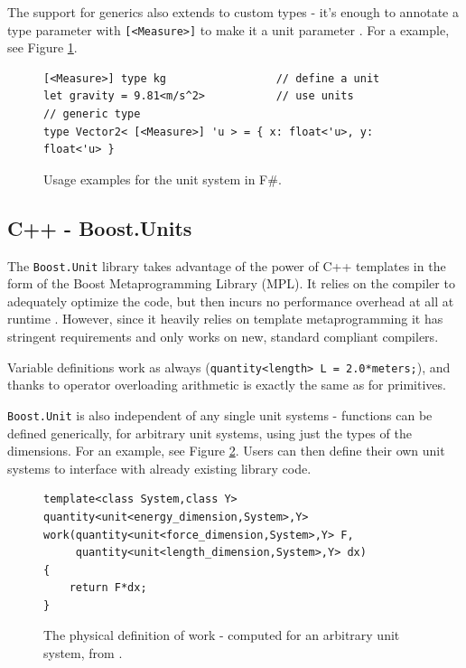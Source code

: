 \documentclass[12pt,oneside,a4paper]{scrbook}
\begin{document}
The support for generics also extends to custom types - it's enough to annotate a type parameter with \verb/[<Measure>]/ to make it a unit parameter \citep{Kennedy08:4}. For a example, see Figure \ref{code:fsharp}.


\begin{figure}
\begin{verbatim}
[<Measure>] type kg                 // define a unit
let gravity = 9.81<m/s^2>           // use units
// generic type
type Vector2< [<Measure>] 'u > = { x: float<'u>, y: float<'u> }
\end{verbatim}
\caption{Usage examples for the unit system in F\#.}
\label{code:fsharp}
\end{figure}

\subsection{C++ - Boost.Units}

The \verb/Boost.Unit/ library takes advantage of the power of C++ templates in the form of the Boost Metaprogramming Library (MPL).  It relies on the compiler to adequately optimize the code, but then incurs no performance overhead at all at runtime \citep{Schabel10}. However, since it heavily relies on template metaprogramming it has stringent requirements and only works on new, standard compliant compilers.

Variable definitions work as always (\verb/quantity<length> L = 2.0*meters;/), and thanks to operator overloading arithmetic is exactly the same as for primitives.

\verb/Boost.Unit/ is also independent of any single unit systems - functions can be defined generically, for arbitrary unit systems, using just the types of the dimensions. For an example, see Figure \ref{code:boost_units_generic}. Users can then define their own unit systems to interface with already existing library code.

\begin{figure}
\begin{verbatim}
template<class System,class Y>
quantity<unit<energy_dimension,System>,Y>
work(quantity<unit<force_dimension,System>,Y> F,
     quantity<unit<length_dimension,System>,Y> dx)
{
    return F*dx;
}
\end{verbatim}
\caption{The physical definition of work - computed for an arbitrary unit system, from \citep{Schabel10}.}
\label{code:boost_units_generic}
\end{figure}
\end{document}
